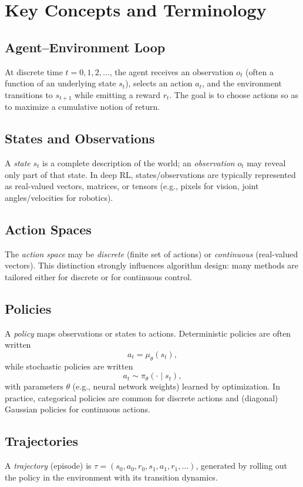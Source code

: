 \section{Key Concepts and Terminology}

\subsection{Agent--Environment Loop}
At discrete time $t=0,1,2,\dots$, the agent receives an observation $o_t$ (often a function of an underlying state $s_t$), selects an action $a_t$, and the environment transitions to $s_{t+1}$ while emitting a reward $r_t$. The goal is to choose actions so as to maximize a cumulative notion of return. \cite{spinningup_rl_intro}

\subsection{States and Observations}
A \emph{state} $s_t$ is a complete description of the world; an \emph{observation} $o_t$ may reveal only part of that state. In deep RL, states/observations are typically represented as real-valued vectors, matrices, or tensors (e.g., pixels for vision, joint angles/velocities for robotics). \cite{spinningup_rl_intro}

\subsection{Action Spaces}
The \emph{action space} may be \emph{discrete} (finite set of actions) or \emph{continuous} (real-valued vectors). This distinction strongly influences algorithm design: many methods are tailored either for discrete or for continuous control. \cite{spinningup_rl_intro}

\subsection{Policies}
A \emph{policy} maps observations or states to actions. Deterministic policies are often written
\[
a_t = \mu_\theta(s_t),
\]
while stochastic policies are written
\[
a_t \sim \pi_\theta(\cdot \mid s_t),
\]
with parameters $\theta$ (e.g., neural network weights) learned by optimization. In practice, categorical policies are common for discrete actions and (diagonal) Gaussian policies for continuous actions. \cite{spinningup_rl_intro}

\subsection{Trajectories}
A \emph{trajectory} (episode) is $\tau=(s_0,a_0,r_0,s_1,a_1,r_1,\ldots)$, generated by rolling out the policy in the environment with its transition dynamics. \cite{spinningup_rl_intro}

